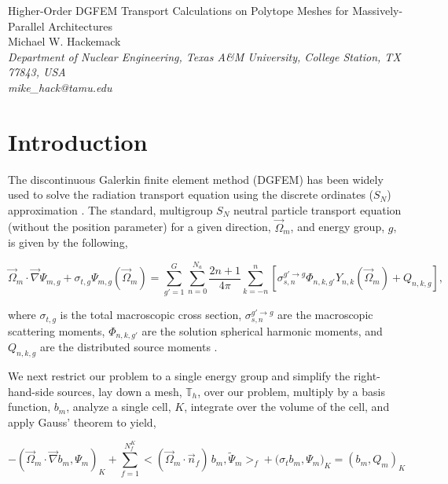 \documentclass[11pt]{article}
\begin{document}
\begin{center}
{\Large Higher-Order DGFEM Transport Calculations on Polytope Meshes for Massively-Parallel Architectures}\\[8mm]
{Michael W. Hackemack} \\[2mm]
{\em \small Department of Nuclear Engineering, Texas A\&M University, College Station, TX 77843, USA} \\[1mm]
{\em mike\_hack@tamu.edu} \\[6mm]
\end{center}

\section{Introduction}
\label{sec::intro}

The discontinuous Galerkin finite element method (DGFEM) has been widely used to solve the radiation transport equation using the discrete ordinates ($S_N$) approximation \cite{reed1973triplet}. The standard, multigroup $S_N$ neutral particle transport equation (without the position parameter) for a given direction, $\vec{\Omega}_m$, and energy group, $g$, is given by the following,

\begin{equation}
\label{eq::trans_eq}
\vec{\Omega}_m \cdot \vec{\nabla} \Psi_{m,g} + \sigma_{t,g} \Psi_{m,g} (\vec{\Omega}_m) = \sum_{g'=1}^G \sum_{n=0}^{N_a} \frac{2n+1}{4 \pi} \sum_{k=-n}^{n} \left[ \sigma_{s,n}^{g' \rightarrow g}  \Phi_{n,k,g'} Y_{n,k} (\vec{\Omega}_m) + Q_{n,k,g}  \right] ,
\end{equation}

\noindent where $\sigma_{t,g}$ is the total macroscopic cross section, $\sigma_{s,n}^{g' \rightarrow g}$ are the macroscopic scattering moments, $\Phi_{n,k,g'}$ are the solution spherical harmonic moments, and $Q_{n,k,g}$ are the distributed source moments \cite{lewis1984computational}. 

We next restrict our problem to a single energy group and simplify the right-hand-side sources, lay down a mesh, $\mathbb{T}_h$, over our problem, multiply by a basis function, $b_m$, analyze a single cell, $K$, integrate over the volume of the cell, and apply Gauss' theorem to yield,

\begin{equation}
\label{eq::disc_trans_eq_cellK}
- \left( \vec{\Omega}_m \cdot  \vec{\nabla} b_m, \Psi_{m} \right)_{K} + \sum_{f=1}^{N_f^K} \Big< ( \vec{\Omega}_m \cdot \vec{n}_f ) \, b_m, \tilde{\Psi}_m  \Big>_{f}  + \Big(  \sigma_{t} b_m ,   \Psi_{m} \Big)_{K} = \left(  b_m ,   Q_m \right)_{K}
\end{equation}
\end{document}

